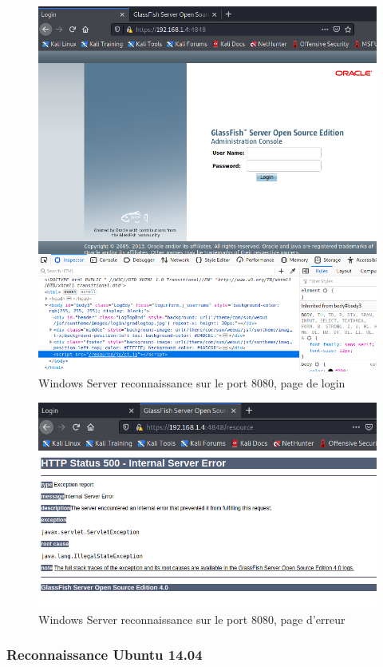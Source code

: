 \documentclass[a4paper]{article}
\begin{document}
\begin{figure}[H]
    \centering
    \includegraphics[width=0.80\linewidth]{images/reconnaissance-10.PNG}
    \caption{Windows Server reconnaissance sur le port 8080, page de login}
    \label{fig:reconnaissance10}
\end{figure}
\begin{figure}[H]
    \centering
    \includegraphics[width=0.70\linewidth]{images/reconnaissance-11.PNG}
    \caption{Windows Server reconnaissance sur le port 8080, page d'erreur}
    \label{fig:reconnaissance11}
\end{figure}





\subsubsection{Reconnaissance Ubuntu 14.04}
\end{document}

